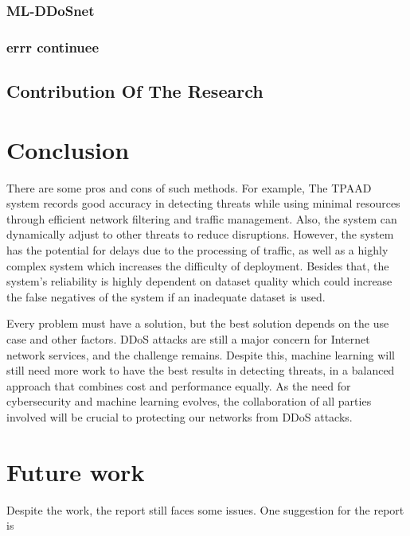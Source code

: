 \documentclass[a4paper, 12pt]{article}
\begin{document}
\subsubsection{ML-DDoSnet}
\subsubsection{errr continuee}
\subsection{Contribution Of The Research}

\section{Conclusion}

There are some pros and cons of such methods. For example, The TPAAD system records good accuracy in detecting threats while using minimal resources through efficient network filtering and traffic management. Also, the system can dynamically adjust to other threats to reduce disruptions. However, the system has the potential for delays due to the processing of traffic, as well as a highly complex system which increases the difficulty of deployment. Besides that, the system's reliability is highly dependent on dataset quality which could increase the false negatives of the system if an inadequate dataset is used. 

Every problem must have a solution, but the best solution depends on the use case and other factors. DDoS attacks are still a major concern for Internet network services, and the challenge remains. Despite this, machine learning will still need more work to have the best results in detecting threats, in a balanced approach that combines cost and performance equally. As the need for cybersecurity and machine learning evolves, the collaboration of all parties involved will be crucial to protecting our networks from DDoS attacks. 

\section{Future work}
Despite the work, the report still faces some issues. One suggestion for the report is 


{}
\end{document}
